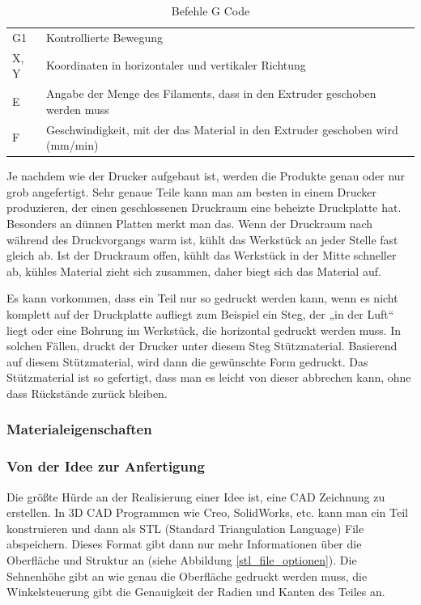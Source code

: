 			\begin{table}[htbp]
  		\centering
  		\caption{Befehle G Code}
	    \begin{tabular}{ll}
	    G1    & Kontrollierte Bewegung \\
	    X, Y  & Koordinaten in horizontaler und vertikaler Richtung \\
	    E     & Angabe der Menge des Filaments, dass in den Extruder geschoben werden muss \\
	    F     & Geschwindigkeit, mit der das Material in den Extruder geschoben wird (mm/min) \\
	    \end{tabular}%
	  	\label{tab:befehle gcode}%
			\end{table}%

		Je nachdem wie der Drucker aufgebaut ist, werden die Produkte genau oder nur grob angefertigt. Sehr genaue Teile kann man am besten in einem Drucker produzieren, der einen geschlossenen Druckraum \bzw eine beheizte Druckplatte hat.
		Besonders an dünnen Platten merkt man das. Wenn der Druckraum nach \bzw während des Druckvorgangs warm ist, kühlt das Werkstück an jeder Stelle fast gleich ab.
		Ist der Druckraum offen, kühlt das Werkstück in der Mitte schneller ab, kühles Material zieht sich zusammen, daher biegt sich das Material auf.

		Es kann vorkommen, dass ein Teil nur so gedruckt werden kann, wenn es nicht komplett auf der Druckplatte aufliegt zum Beispiel ein Steg, der „in der Luft“ liegt oder eine Bohrung im Werkstück, die horizontal gedruckt werden muss.
		In solchen Fällen, druckt der Drucker unter diesem Steg Stützmaterial. Basierend auf diesem Stützmaterial, wird dann die gewünschte Form gedruckt.
		Das Stützmaterial ist so gefertigt, dass man es leicht von dieser abbrechen kann, ohne dass Rückstände zurück bleiben.

		\subsubsection{Materialeigenschaften}

		\subsubsection{Von der Idee zur Anfertigung}

		Die größte Hürde an der Realisierung einer Idee ist, eine CAD Zeichnung zu erstellen. In 3D CAD Programmen wie Creo, SolidWorks, etc. kann man ein Teil konstruieren und dann als STL (Standard Triangulation Language) File abspeichern.
		Dieses Format gibt dann nur mehr Informationen über die Oberfläche und Struktur an (siehe Abbildung \ref{stl_file_optionen}).
		Die Sehnenhöhe gibt an wie genau die Oberfläche gedruckt werden muss, die Winkelsteuerung gibt die Genauigkeit der Radien und Kanten des Teiles an.



